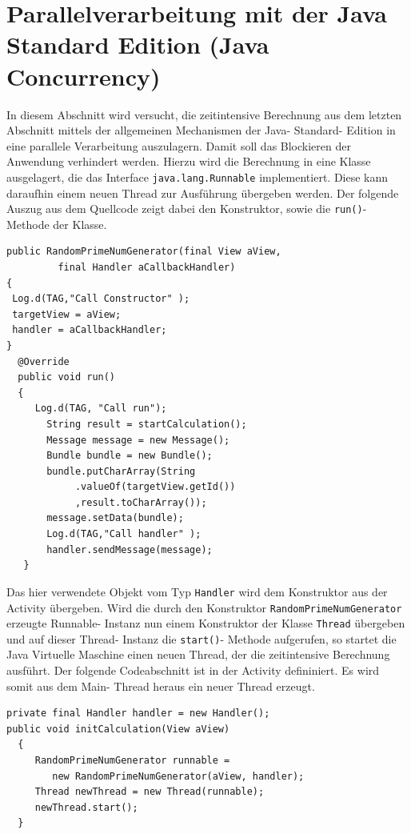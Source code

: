 \documentclass[12pt,oneside,a4paper,bibtotoc,liststotoc]{scrreprt}
\begin{document}
\section{Parallelverarbeitung mit der Java Standard Edition (Java Concurrency)}
In diesem Abschnitt wird versucht, die zeitintensive Berechnung aus dem letzten Abschnitt mittels der allgemeinen Mechanismen der Java- Standard- Edition in eine parallele Verarbeitung auszulagern. Damit soll das Blockieren der Anwendung verhindert werden. Hierzu wird die Berechnung in eine Klasse ausgelagert, die das Interface \texttt{java.lang.Runnable} implementiert. Diese kann daraufhin einem neuen Thread zur Ausführung übergeben werden. Der folgende Auszug aus dem Quellcode zeigt dabei den Konstruktor, sowie die \texttt{run()}- Methode der Klasse.\newline
\begin{lstlisting}
public RandomPrimeNumGenerator(final View aView,
		 final Handler aCallbackHandler)
{ 
 Log.d(TAG,"Call Constructor" );
 targetView = aView;
 handler = aCallbackHandler;
} 
  @Override
  public void run()
  {
     Log.d(TAG, "Call run");
       String result = startCalculation();
       Message message = new Message();
       Bundle bundle = new Bundle();
       bundle.putCharArray(String
       		.valueOf(targetView.getId())
       		,result.toCharArray());
       message.setData(bundle);
       Log.d(TAG,"Call handler" );
       handler.sendMessage(message);
   } 
\end{lstlisting}
Das hier verwendete Objekt vom Typ \texttt{Handler} wird dem Konstruktor aus der Activity übergeben. Wird die durch den Konstruktor \texttt{RandomPrimeNumGenerator} erzeugte Runnable- Instanz nun einem Konstruktor der Klasse \texttt{Thread} übergeben und auf dieser Thread- Instanz die \texttt{start()}- Methode aufgerufen, so startet die Java Virtuelle Maschine einen neuen Thread, der die zeitintensive Berechnung ausführt. Der folgende Codeabschnitt ist in der Activity defininiert. Es wird somit aus dem Main- Thread heraus ein neuer Thread erzeugt.\newpage
\begin{lstlisting}
private final Handler handler = new Handler();
public void initCalculation(View aView)
  { 
     RandomPrimeNumGenerator runnable =
        new RandomPrimeNumGenerator(aView, handler);  
     Thread newThread = new Thread(runnable);
     newThread.start();
  } 

\end{lstlisting}
\end{document}
